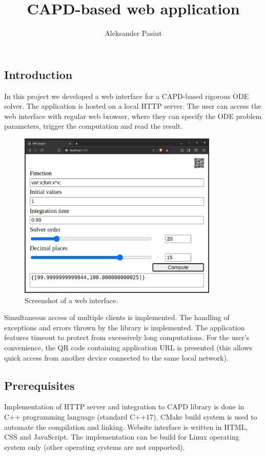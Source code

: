 \documentclass[12pt, a4paper]{article}
\title{CAPD-based web application}
\author{Aleksander Pasiut}
\begin{document}
\maketitle

\subsection*{Introduction}
In this project we developed a web interface for a CAPD-based rigorous ODE solver. The application is hosted on a local HTTP server. The user can access the web interface with regular web browser, where they can specify the ODE problem parameters, trigger the computation and read the result. 

\begin{figure}[h!]
    \begin{center}
        \includegraphics[width=0.85\textwidth]{gui.png}
    \end{center}
    \caption{Screenshot of a web interface.}
    \label{fig:gui}
\end{figure}

Simultaneous access of multiple clients is implemented. The handling of exceptions and errors thrown by the library is implemented. The application features timeout to protect from excessively long computations. For the user's convenience, the QR code containing application URL is presented (this allows quick access from another device connected to the same local network).

\subsection*{Prerequisites}
Implementation of HTTP server and integration to CAPD library is done in C++ programming language (standard C++17). CMake build system is used to automate the compilation and linking. Website interface is written in HTML, CSS and JavaScript. The implementation can be build for Linux operating system only (other operating systems are not supported).
\end{document}
